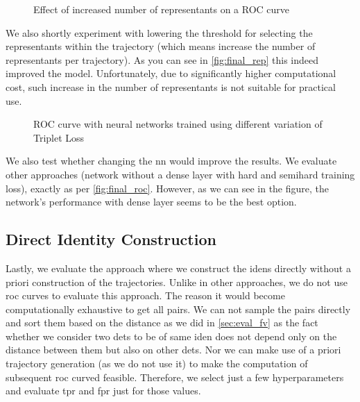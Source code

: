 \begin{figure}
    \centering
    \def\svgwidth{\columnwidth}
    {}
    \caption{Effect of increased number of representants on a ROC curve}
    \label{fig:final_rep}
\end{figure}

We also shortly experiment with lowering the threshold for selecting the representants within the trajectory (which means increase the number of representants per trajectory). As you can see in \autoref{fig:final_rep} this indeed improved the model. Unfortunately, due to significantly higher computational cost, such increase in the number of representants is not suitable for practical use.

\begin{figure}
    \centering
    \def\svgwidth{\columnwidth}
    {}
    \caption{ROC curve with neural networks trained using different variation of Triplet Loss}
    \label{fig:final_nn}
\end{figure}

We also test whether changing the \gls{nn} would improve the results. We evaluate other approaches (network without a dense layer with hard and semihard training loss), exactly as per \autoref{fig:final_roc}. However, as we can see in the figure, the network's performance with dense layer seems to be the best option.

\subsection{Direct Identity Construction}

Lastly, we evaluate the approach where we construct the \glspl{iden} directly without a priori construction of the trajectories. Unlike in other approaches, we do not use \gls{roc} curves to evaluate this approach. The reason it would become computationally exhaustive to get all pairs. We can not sample the pairs directly and sort them based on the distance as we did in \autoref{sec:eval_fv} as the fact whether we consider two \glspl{det} to be of same \gls{iden} does not depend only on the distance between them but also on other \glspl{det}. Nor we can make use of a priori trajectory generation (as we do not use it) to make the computation of subsequent \gls{roc} curved feasible. Therefore, we select just a few hyperparameters and evaluate \gls{tpr} and \gls{fpr} just for those values.


